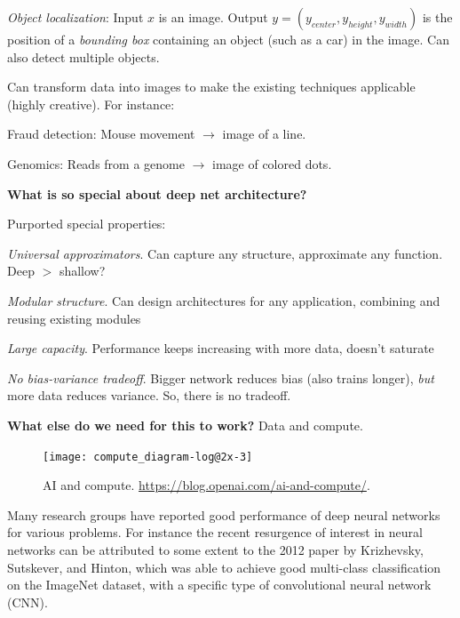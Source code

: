 \documentclass[english]{article}
\begin{document}
\item 
\emph{Object localization}: Input $x$ is an image. Output $y = (y_{center}, y_{height}, y_{width})$ is the position of a \emph{bounding box} containing an object (such as a car) in the image. Can also detect multiple objects.
 
\item Can transform data into images to make the existing techniques applicable (highly creative). For instance: 
\bitem 
\item Fraud detection: Mouse movement $\to$ image of  a line.

\item Genomics: Reads from a genome $\to$ image of colored dots. 
\eitem 
\eenum


\item {\bf What is so special about deep net architecture?} %


Purported special properties: 
\benum
\item
\emph{Universal approximators}. Can capture any structure, approximate any function. Deep $>$ shallow?
\item  \emph{Modular structure}. Can design architectures for any application, combining and reusing existing modules
\item \emph{Large capacity}. Performance keeps increasing with more data, doesn't saturate

\item \emph{No bias-variance tradeoff}. Bigger network reduces bias (also trains longer), \emph{but} more data reduces variance. So, there is no tradeoff. 
\eenum 


\item {\bf What else do we need for this to work?} Data and compute. 

\begin{figure}
  \centering
  \texttt{[image: compute\_diagram-log@2x-3]}
  \caption{AI and compute. \url{https://blog.openai.com/ai-and-compute/}.}
  \label{aic}
\end{figure}

Many research groups have reported good performance of deep neural networks for various problems. For instance the recent resurgence of interest in neural networks can be attributed to some extent to the 2012 paper by Krizhevsky, Sutskever, and Hinton, which  was able to achieve  good multi-class classification on the ImageNet dataset, with a specific type of convolutional neural network (CNN). 
\end{document}
